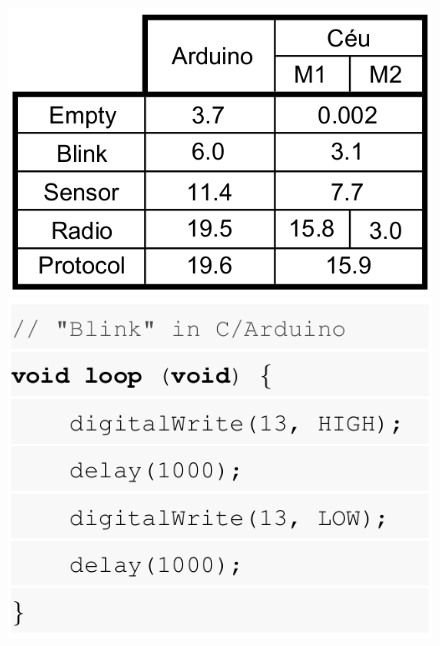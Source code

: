 \documentclass[12pt,english]{amsart}
\begin{document}
\begin{figure}
\begin{minipage}{0.35\textwidth}
\includegraphics[width=\linewidth]{results3}
\end{minipage}
\begin{minipage}{0.33\textwidth}
\includegraphics[width=\linewidth]{blink_c}
\end{minipage}
\begin{minipage}{0.28\textwidth}

\end{minipage}
\end{figure}
\end{document}
